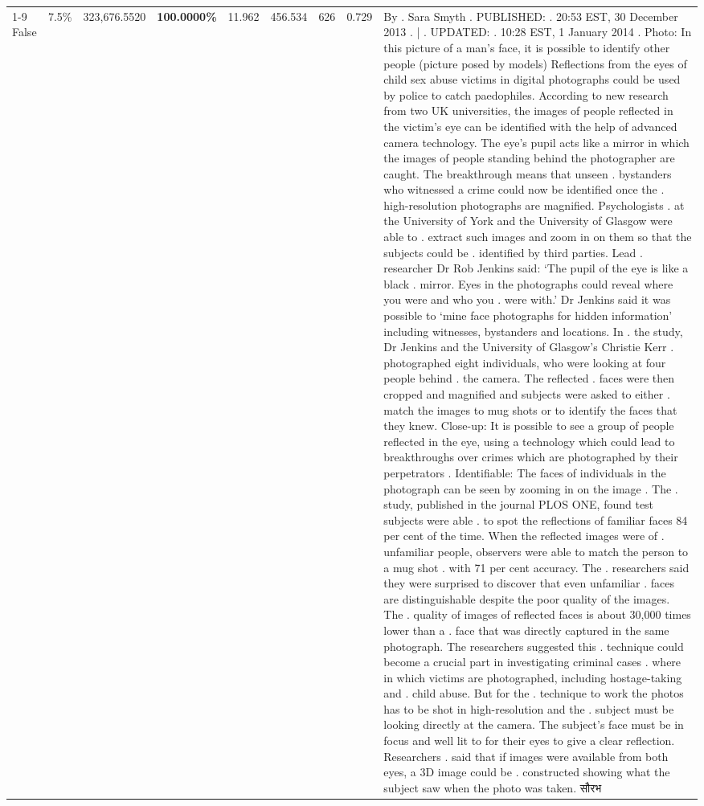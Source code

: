 \begin{table}[H]
\begin{tabular}{lllrlllll}
\cline{1-9}
False & 7.5\% & 323,676.5520 & \bfseries \color{red} 100.0000\% & 11.962 & 456.534 & 626 & 0.729 & By . Sara Smyth . PUBLISHED: . 20:53 EST, 30 December 2013 . | . UPDATED: . 10:28 EST, 1 January 2014 . Photo: In this picture of a man's face, it is possible to identify other people (picture posed by models) Reflections from the eyes of child sex abuse victims in digital photographs could be used by police to catch paedophiles. According to new research from two UK universities, the images of people reflected in the victim's eye can be identified with the help of advanced camera technology. The eye's pupil acts like a mirror in which the images of people standing behind the photographer are caught. The breakthrough means that unseen . bystanders who witnessed a crime could now be identified once the . high-resolution photographs are magnified. Psychologists . at the University of York and the University of Glasgow were able to . extract such images and zoom in on them so that the subjects could be . identified by third parties. Lead . researcher Dr Rob Jenkins said: ‘The pupil of the eye is like a black . mirror. Eyes in the photographs could reveal where you were and who you . were with.' Dr Jenkins said it was possible to ‘mine face photographs for hidden information' including witnesses, bystanders and locations. In . the study, Dr Jenkins and the University of Glasgow's Christie Kerr . photographed eight individuals, who were looking at four people behind . the camera. The reflected . faces were then cropped and magnified and subjects were asked to either . match the images to mug shots or to identify the faces that they knew. Close-up: It is possible to see a group of people reflected in the eye, using a technology which could lead to breakthroughs over crimes which are photographed by their perpetrators . Identifiable: The faces of individuals in the photograph can be seen by zooming in on the image . The . study, published in the journal PLOS ONE, found test subjects were able . to spot the reflections of familiar faces 84 per cent of the time. When the reflected images were of . unfamiliar people, observers were able to match the person to a mug shot . with 71 per cent accuracy. The . researchers said they were surprised to discover that even unfamiliar . faces are distinguishable despite the poor quality of the images. The . quality of images of reflected faces is about 30,000 times lower than a . face that was directly captured in the same photograph. The researchers suggested this . technique could become a crucial part in investigating criminal cases . where in which victims are photographed, including hostage-taking and . child abuse. But for the . technique to work the photos has to be shot in high-resolution and the . subject must be looking directly at the camera. The subject's face must be in focus and well lit to for their eyes to give a clear reflection. Researchers . said that if images were available from both eyes, a 3D image could be . constructed showing what the subject saw when the photo was taken. सौरभ \\

\end{tabular}
\end{table}

